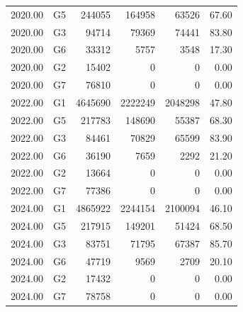 \begin{table}[ht]
\begin{tabular}{rlrrrr}
  2020.00 & G5 & 244055 & 164958 & 63526 & 67.60 \\ 
  2020.00 & G3 & 94714 & 79369 & 74441 & 83.80 \\ 
  2020.00 & G6 & 33312 & 5757 & 3548 & 17.30 \\ 
  2020.00 & G2 & 15402 &   0 &   0 & 0.00 \\ 
  2020.00 & G7 & 76810 &   0 &   0 & 0.00 \\ 
  2022.00 & G1 & 4645690 & 2222249 & 2048298 & 47.80 \\ 
  2022.00 & G5 & 217783 & 148690 & 55387 & 68.30 \\ 
  2022.00 & G3 & 84461 & 70829 & 65599 & 83.90 \\ 
  2022.00 & G6 & 36190 & 7659 & 2292 & 21.20 \\ 
  2022.00 & G2 & 13664 &   0 &   0 & 0.00 \\ 
  2022.00 & G7 & 77386 &   0 &   0 & 0.00 \\ 
  2024.00 & G1 & 4865922 & 2244154 & 2100094 & 46.10 \\ 
  2024.00 & G5 & 217915 & 149201 & 51424 & 68.50 \\ 
  2024.00 & G3 & 83751 & 71795 & 67387 & 85.70 \\ 
  2024.00 & G6 & 47719 & 9569 & 2709 & 20.10 \\ 
  2024.00 & G2 & 17432 &   0 &   0 & 0.00 \\ 
  2024.00 & G7 & 78758 &   0 &   0 & 0.00 \\ 
   \bottomrule
\end{tabular}
\end{table}
